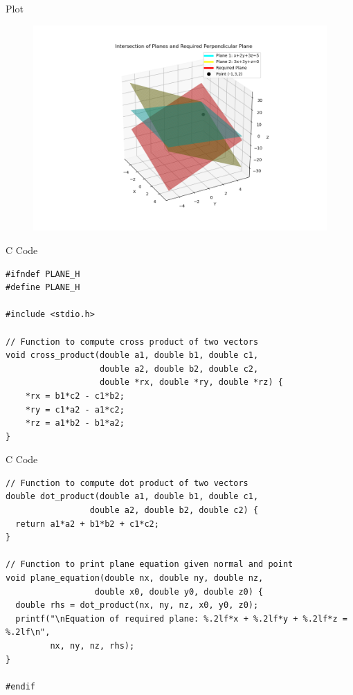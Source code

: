 \documentclass{beamer}
\begin{document}
\begin{frame}{Plot}
    \begin{figure}
        \centering
        \includegraphics[width=1\linewidth]{figs/plot8.png}
        \caption{}
        \label{fig:placeholder}
    \end{figure}
\end{frame}

\begin{frame}[fragile]{C Code}
    \begin{verbatim}
#ifndef PLANE_H
#define PLANE_H

#include <stdio.h>

// Function to compute cross product of two vectors
void cross_product(double a1, double b1, double c1,
                   double a2, double b2, double c2,
                   double *rx, double *ry, double *rz) {
    *rx = b1*c2 - c1*b2;
    *ry = c1*a2 - a1*c2;
    *rz = a1*b2 - b1*a2;
}
    \end{verbatim}
\end{frame}

\begin{frame}[fragile]{C Code}
    \begin{verbatim}
// Function to compute dot product of two vectors
double dot_product(double a1, double b1, double c1,
                 double a2, double b2, double c2) {
  return a1*a2 + b1*b2 + c1*c2;
}

// Function to print plane equation given normal and point
void plane_equation(double nx, double ny, double nz,
                  double x0, double y0, double z0) {
  double rhs = dot_product(nx, ny, nz, x0, y0, z0);
  printf("\nEquation of required plane: %.2lf*x + %.2lf*y + %.2lf*z = %.2lf\n",
         nx, ny, nz, rhs);
}

#endif
    \end{verbatim}
\end{frame}
\end{document}
